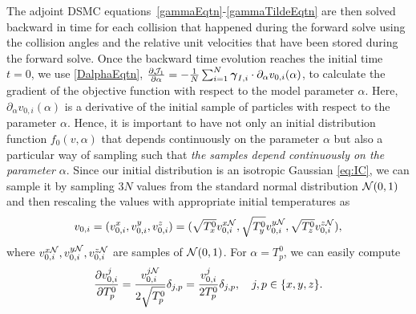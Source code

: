 \documentclass[times,final,nopreprintline]{elsarticle}
\newcommand{\bgamma}{\boldsymbol \gamma}
\newcommand{\red}{\textcolor{red}}
\begin{document}
The adjoint DSMC equations~\eqref{gammaEqtn}-\eqref{gammaTildeEqtn} are then solved backward in time for each collision that happened during the forward solve using the collision angles and the relative unit velocities that have been stored during the forward solve. Once the backward time evolution reaches the initial time $t=0$, we use \eqref{DalphaEqtn}, $\frac{\partial \cJ_1}{\partial \alpha}=- \frac{1}{N}\sum_{i=1}^N \bgamma_{{I}, i} \cdot \partial_\alpha v_{0,i}(\alpha)$, to calculate the gradient of the objective function with respect to the model parameter $\alpha$. Here, $\partial_\alpha v_{0,i}(\alpha)$ is a derivative of the initial sample of particles with respect to the parameter $\alpha$. Hence, it is important to have not only an initial distribution function $f_0(v,\alpha)$ that depends continuously on the parameter $\alpha$ but also a particular way of sampling such that \textit{the samples depend continuously on the parameter $\alpha$}. Since our initial distribution is an isotropic Gaussian \eqref{eq:IC}, we can sample it by sampling $3N$ values from the standard normal distribution $\mathcal N(0,1)$ and then rescaling the values with appropriate initial temperatures as 
$$v_{0,i}=(v_{0,i}^x,v_{0,i}^y,v_{0,i}^z) = (\sqrt{T_x^0}v_{0,i}^{x\mathcal N},\sqrt{T_y^0}v_{0,i}^{y\mathcal N},\sqrt{T_z^0}v_{0,i}^{z\mathcal N}),$$ 
where $v_{0,i}^{x\mathcal N},v_{0,i}^{y\mathcal N},v_{0,i}^{z\mathcal N}$ are samples of $\mathcal N(0,1)$. For $\alpha=T_p^0$, we can easily compute 
$$\frac{\partial v_{0,i}^j}{\partial T_p^0} = \frac{ v_{0,i}^{j\mathcal N} }{2\sqrt{T_p^0}} \delta_{j,p}=\frac{ v_{0,i}^j}{2T_p^0} \delta_{j,p},\quad j,p\in\{x,y,z\}.$$

\end{document}
